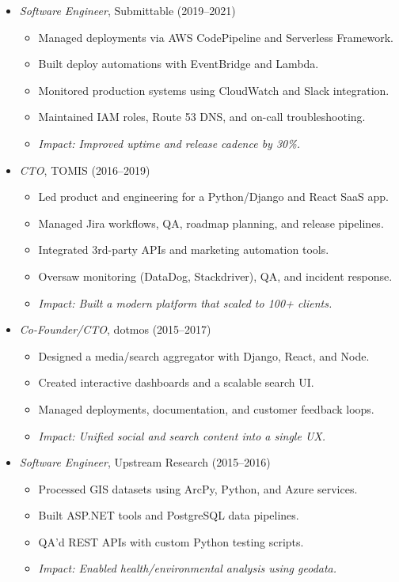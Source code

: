 \documentclass[9pt]{article}
\begin{document}
\begin{multicols}{2}
\begin{itemize}[leftmargin=*]
\item \textit{Software Engineer}, Submittable (2019--2021)
\begin{itemize}[leftmargin=1em]
  \item Managed deployments via AWS CodePipeline and Serverless Framework.
  \item Built deploy automations with EventBridge and Lambda.
  \item Monitored production systems using CloudWatch and Slack integration.
  \item Maintained IAM roles, Route 53 DNS, and on-call troubleshooting.
  \item \textit{Impact: Improved uptime and release cadence by 30\%.}
\end{itemize}

\item \textit{CTO}, TOMIS (2016--2019)
\begin{itemize}[leftmargin=1em]
  \item Led product and engineering for a Python/Django and React SaaS app.
  \item Managed Jira workflows, QA, roadmap planning, and release pipelines.
  \item Integrated 3rd-party APIs and marketing automation tools.
  \item Oversaw monitoring (DataDog, Stackdriver), QA, and incident response.
  \item \textit{Impact: Built a modern platform that scaled to 100+ clients.}
\end{itemize}

\item \textit{Co-Founder/CTO}, dotmos (2015--2017)
\begin{itemize}[leftmargin=1em]
  \item Designed a media/search aggregator with Django, React, and Node.
  \item Created interactive dashboards and a scalable search UI.
  \item Managed deployments, documentation, and customer feedback loops.
  \item \textit{Impact: Unified social and search content into a single UX.}
\end{itemize}

\item \textit{Software Engineer}, Upstream Research (2015--2016)
\begin{itemize}[leftmargin=1em]
  \item Processed GIS datasets using ArcPy, Python, and Azure services.
  \item Built ASP.NET tools and PostgreSQL data pipelines.
  \item QA’d REST APIs with custom Python testing scripts.
  \item \textit{Impact: Enabled health/environmental analysis using geodata.}
\end{itemize}


\end{itemize}
\end{multicols}
\end{document}
